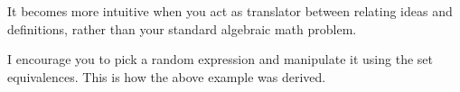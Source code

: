 \noindent
It becomes more intuitive when you act as translator between relating ideas and definitions,
rather than your standard algebraic math problem.\\

\begin{Tip}
    I encourage you to pick a random expression and manipulate it using the set\\
    equivalences. This is how the above example was derived.\\
\end{Tip}